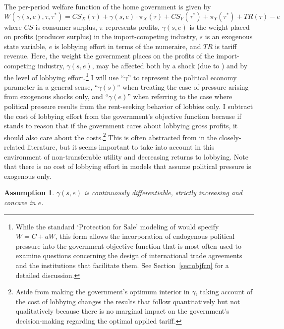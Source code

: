\documentclass[12pt]{article}
\newtheorem{assumption}{Assumption}
\newcommand{\ga}{\gamma}
\begin{document}
The per-period welfare function of the home government is given by
\begin{equation}
  W(\ga(s,e),\tau,\tau^*) = \mathit{CS}_X(\tau) + \ga(s,e) \cdot \pi_X(\tau) + \mathit{CS}_Y(\tau^*) + \pi_Y(\tau^*) + \mathit{TR}(\tau) - e
  \label{eq:wel}
\end{equation}
where $\mathit{CS}$ is consumer surplus, $\pi$ represents profits, $\ga(s,e)$ is the weight placed on profits (producer surplus) in the import-competing industry, $s$ is an exogenous state variable, $e$ is lobbying effort in terms of the numeraire, and $\mathit{TR}$ is tariff revenue. Here, the weight the government places on the profits of the import-competing industry, $\ga(s,e)$, may be affected both by a shock (due to \Textcite{ms2011}) and by the level of lobbying effort.\footnote{While the standard `Protection for Sale' modeling of \Textcite{gh94} would specify $W = C + aW$, this form allows the incorporation of endogenous political pressure into the government objective function that is most often used to examine questions concerning the design of international trade agreements and the institutions that facilitate them. See Section~\ref{sec:objfcn} for a detailed discussion.} I will use ``$\ga$'' to represent the political economy parameter in a general sense, ``$\ga(s)$'' when treating the case of pressure arising from exogenous shocks only, and ``$\ga(e)$'' when referring to the case where political pressure  results from the rent-seeking behavior of lobbies only. I subtract the cost of lobbying effort from the government's objective function because if stands to reason that if the government cares about lobbying gross profits, it should also care about the costs.\footnote{Aside from making the government's optimum interior in $\ga$, taking account of the cost of lobbying changes the results that follow quantitatively but not qualitatively because there is no marginal impact on the government's decision-making regarding the optimal applied tariff.} This is often abstracted from in the closely-related literature, but it seems important to take into account in this environment of non-transferable utility and decreasing returns to lobbying. Note that there is no cost of lobbying effort in models that assume political pressure is exogenous only.

\begin{assumption}
  $\ga(s,e)$ is continuously differentiable, strictly increasing and concave in $e$.
  \label{as:ga_c3}
\end{assumption}
\end{document}
